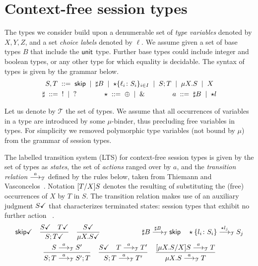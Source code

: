 \section{Context-free session types}
\label{sec:contextfreesession}

The types we consider build upon a denumerable set of \emph{type
  variables} denoted by $X,Y,Z$, and a set \emph{choice labels}
denoted by $\ell$. We assume given a set of base types $B$ that
include the $\unitk$ type. Further base types could include integer
and boolean types, or any other type for which equality is
decidable. The syntax of types is given by the grammar below.
%
\begin{gather*}
  S,T \grmeq \skipk \grmor \sharp B \grmor 
  \star\{\ell_i\colon S_i\}_{i\in I} \grmor S;T \grmor \mu X.S \grmor X
  \\
  \sharp \grmeq {}! \grmor {}? 
  \qquad \qquad
  \star  \grmeq \oplus \grmor {}\&
  \qquad \qquad
  a \grmeq \sharp B \grmor \star l %
\end{gather*}

Let us denote by $\mathcal{T}$ the set of types.
We assume that all occurrences of variables in a type are introduced
by some $\mu$-binder, thus precluding free variables in types.
%
%
For simplicity we removed polymorphic type variables (not bound by
$\mu$) from the grammar of session types.

The labelled transition system (LTS) for context-free session types is
given by the set of types as \emph{states}, the set of \emph{actions}
ranged over by $a$, and the \emph{transition relation} $\LTSderives$
defined by the rules below, taken from Thiemann and
Vasconcelos~\cite{thiemann2016context}.  Notation $\subs{T}{X}S$
denotes the resulting of substituting the (free) occurrences of $X$ by
$T$ in $S$. The transition relation makes use of an auxiliary judgment
$\DONE{S}$ that characterizes terminated states: session types that
exhibit no further action~\cite{DBLP:journals/jacm/AcetoH92} .
%
\begin{gather*}
  \DONE{\skipk}
  \quad
  \frac{\DONE{S} \quad \DONE{T}}{\DONE{S; T}}
  \quad
  \frac{\DONE S}{\DONE{\mu X.S}}
  \qquad \qquad \qquad
  \sharp B \LTSderives[\sharp B] \skipk
  \quad
  \star\{l_i\colon S_i\} \LTSderives[\star l_j] S_j
  \\
  \frac{S \LTSderives S'}{S; T \LTSderives S';T}
  \quad
  \frac{\DONE{S} \quad T \LTSderives T'}{S; T \LTSderives T'}
  \quad
  \frac{\subs{\mu X.S}{X}S \LTSderives T}{\mu X.S \LTSderives T}
\end{gather*}

